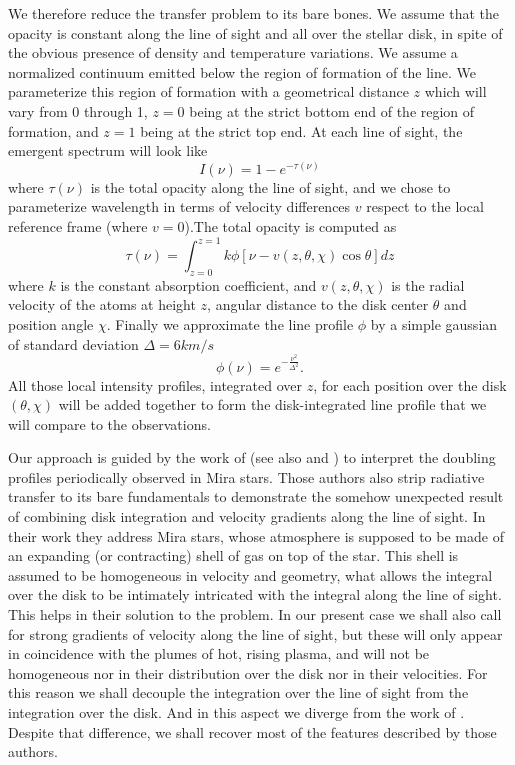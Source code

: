 \documentclass{/Users/art2/TeX/aanda/aa}
\begin{document}
We therefore reduce the transfer problem to its bare bones. We assume that the opacity is constant along the line of sight and all over the stellar 
disk, in spite of the obvious presence of density and temperature variations. We assume a normalized continuum emitted below the region of 
formation of the line. We parameterize this region of formation with a geometrical distance $z$ which will vary from 0 through 1, $z=0$ being at 
the strict bottom end of the region of formation, and $z=1$ being at the strict top end. At each line of sight, the emergent spectrum will look like
\begin{equation}
   I(\nu)=1-e^{-\tau(\nu)}
\end{equation}
where $\tau(\nu)$ is the total opacity along the line of sight, and we chose to parameterize wavelength in terms of velocity differences $v$ respect 
to the local reference frame (where $v=0$).The total opacity is computed as 
\begin{equation}
   \tau(\nu)=\int_{z=0}^{z=1} k \phi[\nu-v(z,\theta,\chi )\cos \theta]dz
   \label{opacityintegral}
\end{equation}
where $k$ is the constant absorption coefficient, and $v(z,\theta,\chi)$ is the radial velocity of the atoms at height $z$, angular distance to the
disk center  $\theta$ and position angle $\chi$. Finally we approximate the line profile $\phi$ by a simple gaussian of standard deviation $\Delta=6 km/s$ \citep{lopez_ariste_convective_2018}
\begin{equation}
   \phi(\nu)= e^{-\frac{\nu^2}{\Delta^2}}.
\end{equation}
All those local intensity profiles, integrated over $z$, for each position over the disk $(\theta,\chi)$ will be added together to form the 
disk-integrated line profile that we will compare to the observations.

Our approach is guided by the work of \cite{bertout_line_1987} (see also \cite{wagenblast_spectral_1983} and \cite{chandrasekhar_formation_1945}) to interpret the doubling profiles periodically observed in Mira 
stars. Those authors also strip radiative transfer to its bare fundamentals to demonstrate the somehow unexpected result of combining disk integration 
and velocity gradients along the line of sight. In their work they address Mira stars, whose atmosphere is supposed to be made of an expanding (or contracting)
shell of gas on top of the star. This shell is assumed to be homogeneous in velocity and geometry, what allows the integral over the disk to be 
intimately intricated with the integral along the line of sight. This helps in their solution to the problem. In our present case we shall also call 
for strong gradients of velocity along the line of sight, but these will only appear in coincidence with the plumes of hot, rising plasma, and will not be 
homogeneous nor in their distribution over the disk nor in their velocities. For this reason we shall decouple the integration over the line 
of sight from the integration over the disk. And in this aspect we diverge from the work of \cite{bertout_line_1987}. Despite that difference, we shall recover most 
of the features described by those authors.
\end{document}
